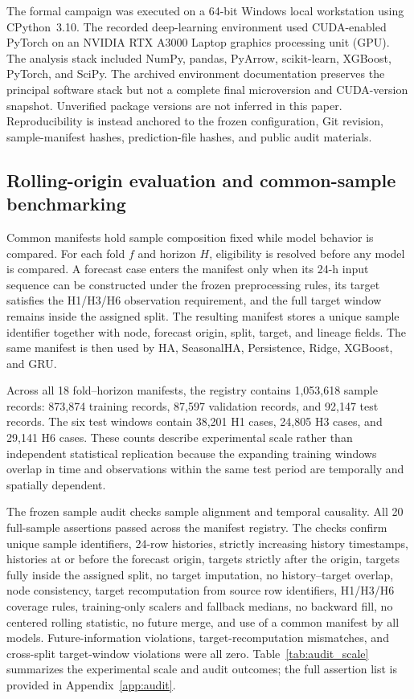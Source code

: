 \documentclass[pdflatex,sn-basic,Numbered]{sn-jnl}
\begin{document}
The formal campaign was executed on a 64-bit Windows local workstation using CPython~3.10. The recorded deep-learning environment used CUDA-enabled PyTorch on an NVIDIA RTX A3000 Laptop graphics processing unit (GPU). The analysis stack included NumPy, pandas, PyArrow, scikit-learn, XGBoost, PyTorch, and SciPy. The archived environment documentation preserves the principal software stack but not a complete final microversion and CUDA-version snapshot. Unverified package versions are not inferred in this paper. Reproducibility is instead anchored to the frozen configuration, Git revision, sample-manifest hashes, prediction-file hashes, and public audit materials.

\subsection{Rolling-origin evaluation and common-sample benchmarking}
\label{subsec:rolling}

Common manifests hold sample composition fixed while model behavior is compared. For each fold $f$ and horizon $H$, eligibility is resolved before any model is compared. A forecast case enters the manifest only when its 24-h input sequence can be constructed under the frozen preprocessing rules, its target satisfies the H1/H3/H6 observation requirement, and the full target window remains inside the assigned split. The resulting manifest stores a unique sample identifier together with node, forecast origin, split, target, and lineage fields. The same manifest is then used by HA, SeasonalHA, Persistence, Ridge, XGBoost, and GRU.

Across all 18 fold--horizon manifests, the registry contains 1,053,618 sample records: 873,874 training records, 87,597 validation records, and 92,147 test records. The six test windows contain 38,201 H1 cases, 24,805 H3 cases, and 29,141 H6 cases. These counts describe experimental scale rather than independent statistical replication because the expanding training windows overlap in time and observations within the same test period are temporally and spatially dependent.

The frozen sample audit checks sample alignment and temporal causality. All 20 full-sample assertions passed across the manifest registry. The checks confirm unique sample identifiers, 24-row histories, strictly increasing history timestamps, histories at or before the forecast origin, targets strictly after the origin, targets fully inside the assigned split, no target imputation, no history--target overlap, node consistency, target recomputation from source row identifiers, H1/H3/H6 coverage rules, training-only scalers and fallback medians, no backward fill, no centered rolling statistic, no future merge, and use of a common manifest by all models. Future-information violations, target-recomputation mismatches, and cross-split target-window violations were all zero. Table~\ref{tab:audit_scale} summarizes the experimental scale and audit outcomes; the full assertion list is provided in Appendix~\ref{app:audit}.
\end{document}
